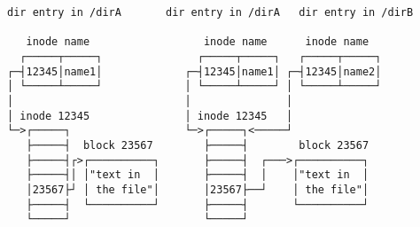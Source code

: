 \documentclass[varwidth=50em,crop]{standalone}
\begin{document}
\begin{verbatim}
dir entry in /dirA       dir entry in /dirA   dir entry in /dirB
                           
   inode name                  inode name      inode name
  ┌─────┬─────┐               ┌─────┬─────┐   ┌─────┬─────┐
┌─┤12345│name1│             ┌─┤12345│name1│ ┌─┤12345│name2│
│ └─────┴─────┘             │ └─────┴─────┘ │ └─────┴─────┘
│                           │               │
│ inode 12345               │ inode 12345   │
└─>┌─────┐                  └─>┌─────┐<─────┘
   ├─────┤  block 23567        ├─────┤        block 23567
   ├─────┤┌>┌──────────┐       ├─────┤  ┌───>┌──────────┐
   ├─────┤│ │"text in  │       ├─────┤  │    │"text in  │
   │23567├┘ │ the file"│       │23567├──┘    │ the file"│
   ├─────┤  └──────────┘       ├─────┤       └──────────┘
   └─────┘                     └─────┘
\end{verbatim}
\end{document}
